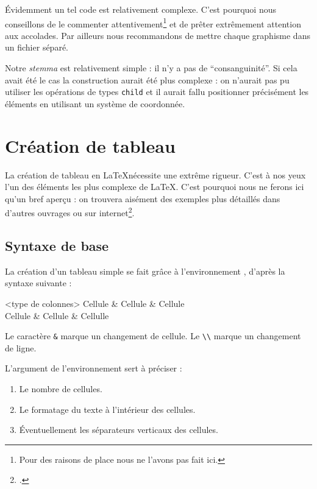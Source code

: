 Évidemment un tel code est relativement complexe. C'est pourquoi nous conseillons de le commenter attentivement\footnote{Pour des raisons de place nous ne l'avons pas fait ici.} et de prêter extrêmement attention  aux accolades. Par ailleurs nous recommandons de mettre chaque graphisme  dans un fichier séparé.


Notre \emph{stemma} est relativement simple : il n'y a pas de \enquote{consanguinité}. Si cela avait été le cas la construction aurait été plus complexe : on n'aurait pas pu utiliser les opérations de types \verb|child| et il aurait fallu positionner précisément les éléments en utilisant un système de coordonnée.



\section{Création de tableau}

\begin{attention}
La création de tableau en \LaTeX nécessite  une extrême rigueur. 
C'est à nos yeux l'un des éléments les plus complexe de \LaTeX. C'est pourquoi nous ne ferons ici qu'un bref aperçu : on trouvera aisément des exemples plus détaillés dans d'autres ouvrages ou sur internet\footcite[On pourra consulter des fichiers assez didactiques :][]{bebert_tableaux}.

\end{attention}

\subsection{Syntaxe de base}

La création d'un tableau simple se fait grâce à l'environnement , d'après la syntaxe suivante :

\begin{latexcode}
\begin{tabular}{<type de colonnes>}
    Cellule & Cellule & Cellule \\
    Cellule & Cellule & Cellulle \\
\end{tabular}
\end{latexcode}

Le caractère \verb|&| marque un changement de cellule. Le \verb|\\| marque un changement de ligne.

L'argument  de l'environnement  sert à préciser :
\begin{enumerate}
    \item Le nombre de cellules.
    \item Le formatage du texte à l'intérieur des cellules.
    \item Éventuellement les séparateurs verticaux des cellules.
    
\end{enumerate}

